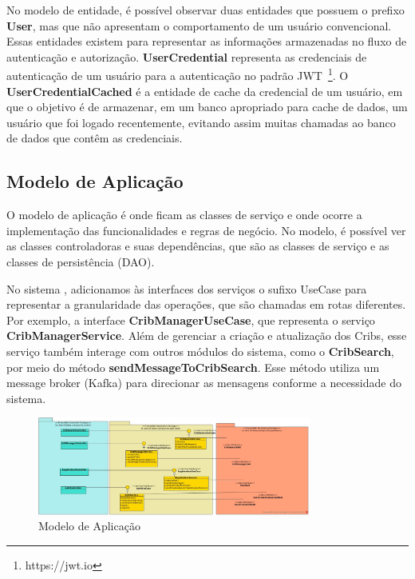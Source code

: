 No modelo de entidade, é possível observar duas entidades que possuem o prefixo \textbf{User}, mas que não apresentam o comportamento de um usuário convencional. Essas entidades existem para representar as informações armazenadas no fluxo de autenticação e autorização. \textbf{UserCredential} representa as credenciais de autenticação de um usuário para a autenticação no padrão JWT~\footnote{https://jwt.io}. O \textbf{UserCredentialCached} é a entidade de cache da credencial de um usuário, em que  o objetivo é de armazenar, em um banco apropriado para cache de dados, um usuário que foi logado recentemente, evitando assim muitas chamadas ao banco de dados que contêm as credenciais.

\subsection{Modelo de Aplicação}

O modelo de aplicação é onde ficam as classes de serviço \cite{phdthesis} e onde ocorre a implementação das funcionalidades e regras de negócio. No modelo, é possível ver as classes controladoras e suas dependências, que são as classes de serviço e as classes de persistência (DAO). 

No sistema \emph{\imprimirtitulo}, adicionamos às interfaces dos serviços o sufixo UseCase para representar a granularidade das operações, que são chamadas em rotas diferentes. Por exemplo, a interface \textbf{CribManagerUseCase}, que representa o serviço \textbf{CribManagerService}. Além de gerenciar a criação e atualização dos Cribs, esse serviço também interage com outros módulos do sistema, como o \textbf{CribSearch}, por meio do método \textbf{sendMessageToCribSearch}. Esse método utiliza um message broker (Kafka) para direcionar as mensagens conforme a necessidade do sistema.


\begin{figure}[h]
\centering
\includegraphics[width=0.8\textwidth]{figuras/modelo-de-aplicacao.jpg}
\caption{Modelo de Aplicação}
\label{figura-arquitetura-aplicacao}
\end{figure}

